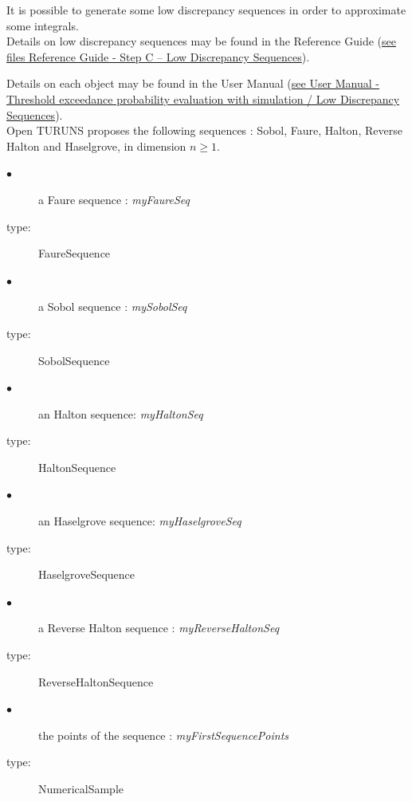\renewcommand{\filename}{docUC_LowDiscrepancySequences.tex}
\renewcommand{\filetitle}{UC : Generation of low discrepancy sequences}

\HeaderIILevel

\label{lowDiscrepancySequence}



It is possible to generate some low discrepancy sequences in order to approximate some integrals.\\

Details on low discrepancy sequences  may be found in the Reference Guide (\href{OpenTURNS_ReferenceGuide.pdf}{see files Reference Guide - Step C -- Low Discrepancy Sequences}).



Details on each object may be found in the User Manual  (\href{OpenTURNS_UserManual_TUI.pdf}{see User Manual - Threshold exceedance probability evaluation with simulation / Low Discrepancy Sequences}).\\


Open TURUNS proposes the following sequences : Sobol, Faure, Halton, Reverse Halton and Haselgrove, in dimension $n \geq 1$.


\requirements{
  \begin{description}
  \item[$\bullet$] -
  \end{description}
}
{
  \begin{description}
  \item[$\bullet$] a Faure sequence : {\itshape myFaureSeq}
  \item[type:] FaureSequence
  \item[$\bullet$] a Sobol sequence : {\itshape mySobolSeq}
  \item[type:] SobolSequence
  \item[$\bullet$] an Halton sequence: {\itshape myHaltonSeq}
  \item[type:] HaltonSequence
  \item[$\bullet$] an Haselgrove sequence: {\itshape myHaselgroveSeq}
  \item[type:] HaselgroveSequence
  \item[$\bullet$] a Reverse Halton sequence : {\itshape myReverseHaltonSeq}
  \item[type:] ReverseHaltonSequence
  \item[$\bullet$] the points of the sequence : {\itshape myFirstSequencePoints}
  \item[type:] NumericalSample
  \end{description}
}

